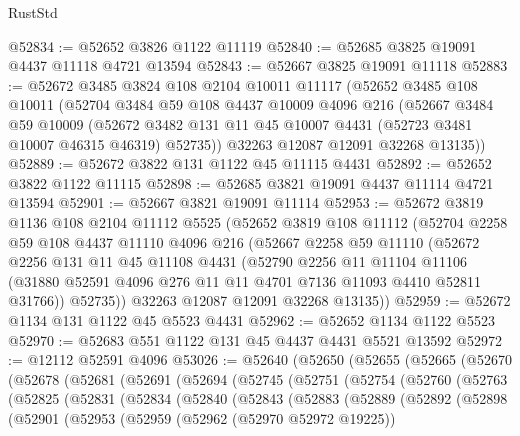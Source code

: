 \begin{lexlean}{RustStd}
\begin{coremodule}
@52834 := @52652 @3826 @1122 @11119
@52840 := @52685 @3825 @19091 @4437 @11118 @4721 @13594
@52843 := @52667 @3825 @19091 @11118
@52883 := @52672
    @3485
    @3824
    @108
    @2104
    @10011
    @11117
    (@52652
      @3485
      @108
      @10011
      (@52704
        @3484
        @59
        @108
        @4437
        @10009
        @4096
        @216
        (@52667
          @3484
          @59
          @10009
          (@52672 @3482 @131 @11 @45 @10007 @4431 (@52723 @3481 @10007 @46315 @46319) @52735))
        @32263
        @12087
        @12091
        @32268
        @13135))
@52889 := @52672 @3822 @131 @1122 @45 @11115 @4431
@52892 := @52652 @3822 @1122 @11115
@52898 := @52685 @3821 @19091 @4437 @11114 @4721 @13594
@52901 := @52667 @3821 @19091 @11114
@52953 := @52672
    @3819
    @1136
    @108
    @2104
    @11112
    @5525
    (@52652
      @3819
      @108
      @11112
      (@52704
        @2258
        @59
        @108
        @4437
        @11110
        @4096
        @216
        (@52667
          @2258
          @59
          @11110
          (@52672
            @2256
            @131
            @11
            @45
            @11108
            @4431
            (@52790
              @2256
              @11
              @11104
              @11106
              (@31880 @52591 @4096 @276 @11 @11 @4701 @7136 @11093 @4410 @52811 @31766))
            @52735))
        @32263
        @12087
        @12091
        @32268
        @13135))
@52959 := @52672 @1134 @131 @1122 @45 @5523 @4431
@52962 := @52652 @1134 @1122 @5523
@52970 := @52683 @551 @1122 @131 @45 @4437 @4431 @5521 @13592
@52972 := @12112 @52591 @4096
@53026 := @52640
    (@52650
      (@52655
        (@52665
          (@52670
            (@52678
              (@52681
                (@52691
                  (@52694
                    (@52745
                      (@52751
                        (@52754
                          (@52760
                            (@52763
                              (@52825
                                (@52831
                                  (@52834
                                    (@52840
                                      (@52843
                                        (@52883
                                          (@52889
                                            (@52892
                                              (@52898
                                                (@52901
                                                  (@52953
                                                    (@52959
                                                      (@52962 (@52970 @52972 @19225))

\end{coremodule}
\end{lexlean}

